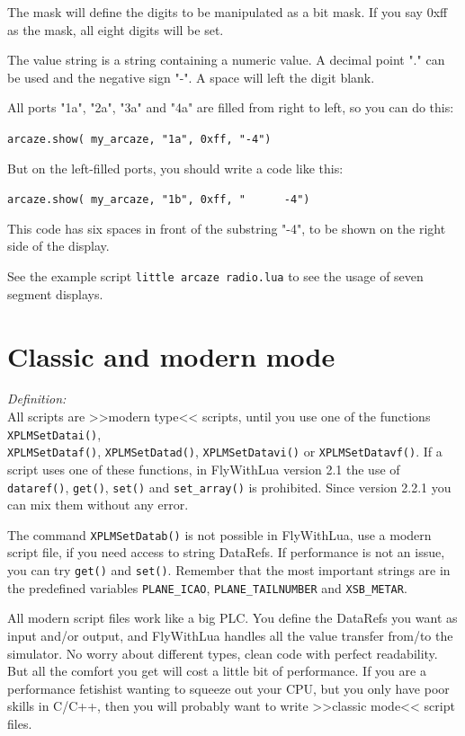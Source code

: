 \documentclass[11pt,parskip=half,a4paper]{scrartcl}
\begin{document}
The mask will define the digits to be manipulated as a bit mask. If you say 0xff as the mask, all eight digits will be set.

The value string is a string containing a numeric value. A decimal point "." can be used and the negative sign "-". A space will left the digit blank.

All ports "1a", "2a", "3a" and "4a" are filled from right to left, so you can do this:

\verb|arcaze.show( my_arcaze, "1a", 0xff, "-4")|

But on the left-filled ports, you should write a code like this:

\verb|arcaze.show( my_arcaze, "1b", 0xff, "      -4")|

This code has six spaces in front of the substring "-4", to be shown on the right side of the display.

See the example script \verb|little arcaze radio.lua| to see the usage of seven segment displays.

\newpage
\section{Classic and modern mode}

\emph{Definition:}\\
All scripts are >>modern type<< scripts, until you use one of the functions \verb|XPLMSetDatai()|,\\ \verb|XPLMSetDataf()|, \verb|XPLMSetDatad()|, \verb|XPLMSetDatavi()| or \verb|XPLMSetDatavf()|. If a script uses one of these functions, in FlyWithLua version 2.1 the use of \verb|dataref()|, \verb|get()|, \verb|set()| and \verb|set_array()| is prohibited. Since version 2.2.1 you can mix them without any error.\\

\vspace{2ex}

The command \verb|XPLMSetDatab()| is not possible in FlyWithLua, use a modern script file, if you need access to string DataRefs. If performance is not an issue, you can try \verb|get()| and \verb|set()|. Remember that the most important strings are in the predefined variables \verb|PLANE_ICAO|, \verb|PLANE_TAILNUMBER| and \verb|XSB_METAR|.

All modern script files work like a big PLC. You define the DataRefs you want as input and/or output, and FlyWithLua handles all the value transfer from/to the simulator. No worry about different types, clean code with perfect readability. But all the comfort you get will cost a little bit of performance. If you are a performance fetishist wanting to squeeze out your CPU, but you only have poor skills in C/C++, then you will probably want to write >>classic mode<< script files.
\end{document}
